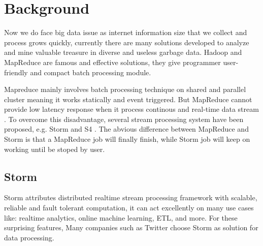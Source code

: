 \chapter{Background}
\label{chap:background}

Now we do face big data issue as internet information size that we collect and process grows quickly, currently there are many solutions developed
 to analyze and mine valuable treasure in diverse and useless garbage data. Hadoop \cite{5496972} and MapReduce \cite{Dean:2008:MSD:1327452.1327492} are famous 
and effective solutions, they give programmer user-friendly and compact batch processing module. 

Mapreduce mainly involves batch processing technique on shared and parallel cluster meaning it works statically 
and event triggered. But MapReduce cannot provide low latency response when it process continous and real-time data stream \cite{Babcock:2002:MID:543613.543615}.
To overcome this disadvantage, several stream processing system have been proposed, e.g. Storm \cite{Aniello:2013:AOS:2488222.2488267}
 and S4 \cite{5693297}. The abvious difference between MapReduce and Storm is that a MapReduce job will finally finish, while Storm job will keep on working until be stoped by user.  

\section{Storm}

Storm attributes distributed realtime stream processing framework with scalable, reliable and
 fault tolerant computation, it can act excellently on many use cases like: realtime analytics, online machine learning, ETL, and 
more. For these surprising features, Many companies such as Twitter choose Storm as solution for data processing. 

